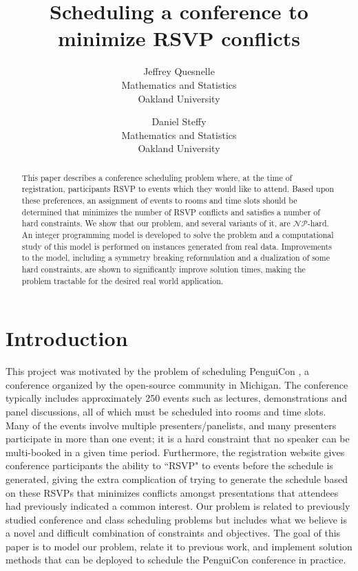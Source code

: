 \documentclass[]{article}
\title{Scheduling a conference to minimize RSVP conflicts}
\author{
Jeffrey Quesnelle\\
Mathematics and Statistics\\
Oakland University \and 
Daniel Steffy\\
Mathematics and Statistics\\
Oakland University}
\theoremstyle{definition}
\theoremstyle{remark}
\numberwithin{equation}{section}
\newcommand{\cNP}{$\mathcal{NP}$}
\begin{document}
\maketitle

\begin{abstract}
This paper describes a conference scheduling problem where, at the time of registration, participants RSVP to events which they would like to attend.
Based upon these preferences, an assignment of events to rooms and time slots should be determined that minimizes the number of RSVP conflicts and satisfies a number of hard constraints.
We show that our problem, and several variants of it, are \cNP-hard.
An integer programming model is developed to solve the problem and a computational study of this model is performed on instances generated from real data.
Improvements to the model, including a symmetry breaking reformulation and a dualization of some hard constraints, are shown to significantly improve solution times, making the problem tractable for the desired real world application.
\end{abstract}

\section{Introduction}

This project was motivated by the problem of scheduling PenguiCon , a conference organized by the open-source community in Michigan.  
The conference typically includes approximately 250 events such as lectures, demonstrations and panel discussions, all of which must be scheduled into rooms and time slots.
Many of the events involve multiple presenters/panelists, and many presenters participate in more than one event; it is a hard constraint that no speaker can be multi-booked in a given time period.
Furthermore, the registration website gives conference participants the ability to ``RSVP" to events before the schedule is generated, giving the extra complication of trying to generate the schedule based on these RSVPs that minimizes conflicts amongst presentations that attendees had previously indicated a common interest.
Our problem is related to previously studied conference and class scheduling problems but includes what we believe is a novel and difficult combination of constraints and objectives.
The goal of this paper is to model our problem, relate it to previous work, and implement solution methods that can be deployed to schedule the PenguiCon conference in practice.
\end{document}
